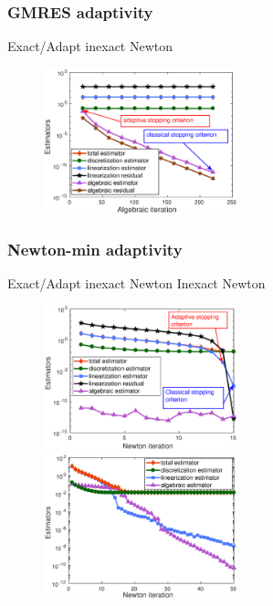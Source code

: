 \documentclass[aspectratio=169]{beamer}
\begin{document}
\begin{frame}
\frametitle{GMRES adaptivity}
\hspace{5.5 cm} Exact/Adapt inexact Newton \hspace{3.5 cm } 
\begin{figure}
   \centering
\includegraphics[width=0.50\textwidth]{fig_article_chap_1/exact_adapt_res_estimators_gmres_iter_first_newton_iter_Hmax_015.eps}    
\end{figure}
\end{frame}
\begin{frame}
\frametitle{Newton-min adaptivity}
\hspace{2 cm} Exact/Adapt inexact Newton \hspace{3.5 cm } Inexact Newton\begin{figure}
\includegraphics[width=0.5\textwidth]{fig_article_chap_1/exact_adapt_resolution_estimators_newton_iter_Hmax_015.eps}    
\includegraphics[width=0.5\textwidth]{fig_article_chap_1/inexacte_resolution_Hmax_015_estimators_newton_step.eps}     
\end{figure}
\end{frame}
\end{document}
